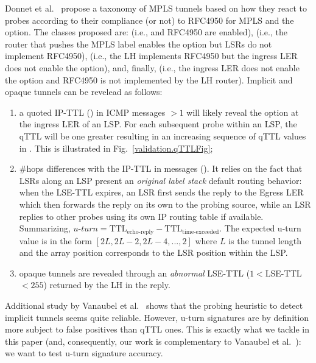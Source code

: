Donnet et al.~\cite{Donnet12} propose a taxonomy of MPLS tunnels based on how
they react to \traceroute probes according to their compliance (or not) to
RFC4950 for MPLS and the \tpropagate option.  The classes proposed are:
 (i.e., \tpropagate and RFC4950 are enabled),
 (i.e., the router that pushes the MPLS label enables the
\tpropagate option but LSRs do not implement RFC4950), 
(i.e., the LH implements RFC4950 but the ingress LER does not enable the
\tpropagate option), and, finally,  (i.e., the ingress
LER does not enable the \tpropagate option and RFC4950 is not implemented by the
LH router).  Implicit and opaque tunnels can be revelead as follows:
\begin{enumerate}
  \item a quoted IP-TTL () in ICMP \ttlexceeded messages $>1$ will
  likely reveal the \tpropagate option at the ingress LER of an LSP. For each
  subsequent \traceroute probe within an LSP, the qTTL will be one greater
  resulting in an increasing sequence of qTTL values in \traceroute.  This is
  illustrated in Fig.~\ref{validation.qTTLFig};
  \item  \#hops differences with the IP-TTL in \echoreply messages
  ().  It relies on the fact that LSRs along an LSP present an
  \textit{original label stack} default routing behavior: when the LSE-TTL
  expires, an LSR first sends the \ttlexceeded reply to the Egress LER which
  then forwards the reply on its own to the probing source, while an LSR
  replies to other probes using its own IP routing table if available. Summarizing, 
  $\textit{u-turn}=\text{TTL}_{\text{echo-reply}}-\text{TTL}_{\text{time-exceeded}}$.
  The expected u-turn value is in the form $[2L, 2L-2, 2L-4,..., 2]$ where $L$
  is the tunnel length and the array position corresponds to the LSR position
  within the LSP.
  \item opaque tunnels are revealed through an \textit{abnormal} LSE-TTL
  ($1<$LSE-TTL$<255$) returned by the LH in the \ttlexceeded reply.
\end{enumerate}

Additional study by Vanaubel et al.~\cite{VAN2013} shows that the probing
heuristic to detect implicit tunnels seems quite reliable.  However, u-turn
signatures are by definition more subject to false positives than qTTL ones. 
This is exactly what we tackle in this paper (and, consequently, our work is
complementary to Vanaubel et al.~\cite{VAN2013}): we want to test u-turn
signature accuracy.

